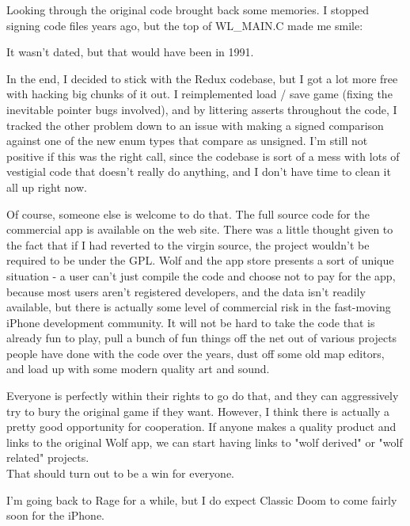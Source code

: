 \documentclass[book.tex]{subfiles}
\begin{document}
Looking through the original code brought back some memories.  I stopped signing code files years ago, but the top of WL\_MAIN.C made me smile:\\
\par
\begin{minipage}{\textwidth}

\end{minipage}
\par
It wasn't dated, but that would have been in 1991.\\
\par

In the end, I decided to stick with the Redux codebase, but I got a lot more free with hacking big chunks of it out.  I reimplemented load / save game (fixing the inevitable pointer bugs involved), and by littering asserts throughout the code, I tracked the other problem down to an issue with making a signed comparison against one of the new enum types that compare as unsigned.  I'm still not positive if this was the right call, since the codebase is sort of a mess with lots of vestigial code that doesn't really do anything, and I don't have time to clean it all up right now.\\
\par

Of course, someone else is welcome to do that.  The full source code for the commercial app is available on the web site.  There was a little thought given to the fact that if I had reverted to the virgin source, the project wouldn't be required to be under the GPL.  Wolf and the app store presents a sort of unique situation - a user can't just compile the code and choose not to pay for the app, because most users aren't registered developers, and the data isn't readily available, but there is actually some level of commercial risk in the fast-moving iPhone development community.  It will not be hard to take the code that is already fun to play, pull a bunch of fun things off the net out of various projects people have done with the code over the years, dust off some old map editors, and load up with some modern quality art and sound.\\
\par

Everyone is perfectly within their rights to go do that, and they can aggressively try to bury the original game if they want.  However, I think there is actually a pretty good opportunity for cooperation.  If anyone makes a quality product and links to the original Wolf app, we can start having links to "wolf derived" or "wolf related" projects.\\
That should turn out to be a win for everyone.\\
\par

I'm going back to Rage for a while, but I do expect Classic Doom to come fairly soon for the iPhone.\\
\par

 






 




 
\end{document}
